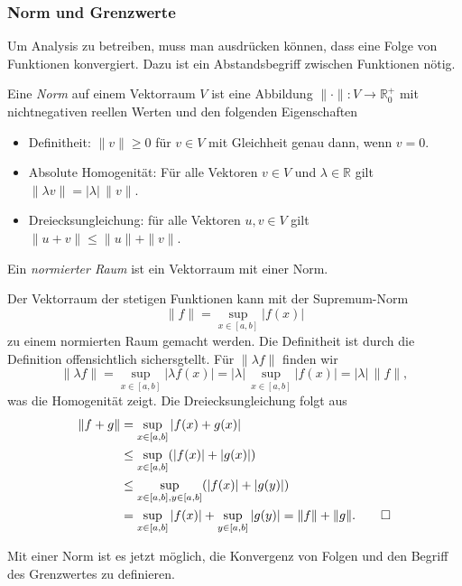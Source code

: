 %
%
\subsubsection{Norm und Grenzwerte}
Um Analysis zu betreiben, muss man ausdrücken können, dass eine Folge
von Funktionen konvergiert.
Dazu ist ein Abstandsbegriff zwischen Funktionen nötig.

\begin{definition}
Eine {\em Norm} auf einem Vektorraum $V$ ist eine Abbildung
%
$\|\cdot\|\colon V\to\mathbb{R}^+_0$ mit nichtnegativen reellen Werten
und den folgenden Eigenschaften
\begin{itemize}
\item Definitheit: $\|v\|\ge 0$ für $v\in V$ mit Gleichheit 
genau dann, wenn $v=0$.
%
\item Absolute Homogenität: Für alle Vektoren $v\in V$ und
%
$\lambda\in\mathbb{R}$ gilt $\|\lambda v\| = |\lambda|\, \|v\|$.
\item Dreiecksungleichung: für alle Vektoren $u,v\in V$ gilt
%
$\|u+v\|\le \|u\|+\|v\|$.
\end{itemize}
Ein {\em normierter Raum} ist ein Vektorraum mit einer Norm.
%
\end{definition}

\begin{beispiel}
Der Vektorraum der stetigen Funktionen kann mit der Supremum-Norm
\[
\|f\| = \sup_{x\in[a,b]} |f(x)|
\]
zu einem normierten Raum gemacht werden.
Die Definitheit ist durch die Definition offensichtlich sichersgtellt.
Für $\|\lambda f\|$ finden wir
\[
\|\lambda f\|
=
\sup_{x\in[a,b]} |\lambda f(x)|
=
|\lambda|\,
\sup_{x\in[a,b]} |f(x)|
=
|\lambda|\, \|f\|,
\]
was die Homogenität zeigt.
Die Dreiecksungleichung folgt aus
\begin{align*}
\|f+g\|
&=
\sup_{x\in[a,b]} |f(x)+g(x)|
\\
&\le
\sup_{x\in[a,b]} (|f(x)|+|g(x)|)
\\
&\le
\sup_{x\in[a,b], y\in[a,b]} (|f(x)|+|g(y)|)
\\
&=
\sup_{x\in[a,b]} |f(x)|
+
\sup_{y\in[a,b]} |g(y)|
=
\|f\| + \|g\|.
\qedhere
\end{align*}
\end{beispiel}

Mit einer Norm ist es jetzt möglich, die Konvergenz von Folgen und den
Begriff des Grenzwertes zu definieren.

